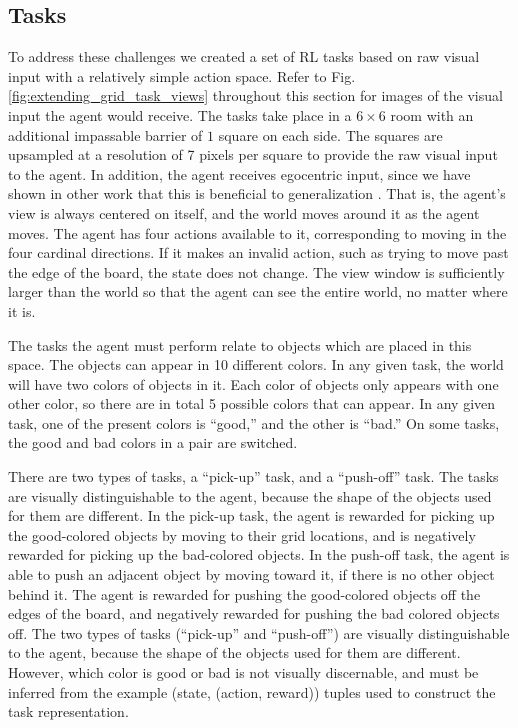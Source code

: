 \subsection{Tasks}
To address these challenges we created a set of RL tasks based on raw visual input with a relatively simple action space. Refer to Fig. \ref{fig:extending_grid_task_views} throughout this section for images of the visual input the agent would receive. The tasks take place in a \(6 \times 6\) room with an additional impassable barrier of \(1\) square on each side. The squares are upsampled at a resolution of 7 pixels per square to provide the raw visual input to the agent. In addition, the agent receives egocentric input, since we have shown in other work that this is beneficial to generalization \citep{Hill2019a}. That is, the agent's view is always centered on itself, and the world moves around it as the agent moves. The agent has four actions available to it, corresponding to moving in the four cardinal directions. If it makes an invalid action, such as trying to move past the edge of the board, the state does not change. The view window is sufficiently larger than the world so that the agent can see the entire world, no matter where it is.\par 
The tasks the agent must perform relate to objects which are placed in this space. The objects can appear in 10 different colors. In any given task, the world will have two colors of objects in it. Each color of objects only appears with one other color, so there are in total 5 possible colors that can appear. In any given task, one of the present colors is ``good,'' and the other is ``bad.'' On some tasks, the good and bad colors in a pair are switched.\par
There are two types of tasks, a ``pick-up'' task, and a ``push-off'' task. The tasks are visually distinguishable to the agent, because the shape of the objects used for them are different. In the pick-up task, the agent is rewarded for picking up the good-colored objects by moving to their grid locations, and is negatively rewarded for picking up the bad-colored objects. In the push-off task, the agent is able to push an adjacent object by moving toward it, if there is no other object behind it. The agent is rewarded for pushing the good-colored objects off the edges of the board, and negatively rewarded for pushing the bad colored objects off. The two types of tasks (``pick-up'' and ``push-off'') are visually distinguishable to the agent, because the shape of the objects used for them are different. However, which color is good or bad is not visually discernable, and must be inferred from the example (state, (action, reward)) tuples used to construct the task representation.\par 
